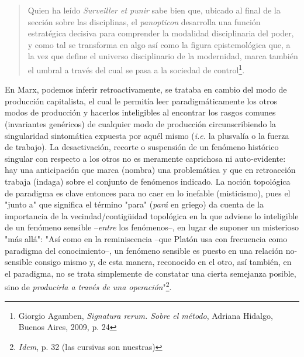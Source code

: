 \documentclass{book}
\begin{document}
\begin{quote}
Quien ha leído \emph{Surveiller et punir} sabe bien que, ubicado al
final de la sección sobre las disciplinas, el \emph{panopticon}
desarrolla una función estratégica decisiva para comprender la modalidad
disciplinaria del poder, y como tal se transforma en algo así como la
figura epistemológica que, a la vez que define el universo disciplinario
de la modernidad, marca también el umbral a través del cual se pasa a la
sociedad de control\footnote{Giorgio Agamben, \emph{Signatura rerum.
  Sobre el método}, Adriana Hidalgo, Buenos Aires, 2009, p. 24}.
\end{quote}

En Marx, podemos inferir retroactivamente, se trataba en cambio del modo
de producción capitalista, el cual le permitía leer paradigmáticamente
los otros modos de producción y hacerlos inteligibles al encontrar los
rasgos comunes (invariantes genéricos) de cualquier modo de producción
circunscribiendo la singularidad sintomática expuesta por aquél mismo
(\emph{i.e.} la plusvalía o la fuerza de trabajo). La desactivación,
recorte o suspensión de un fenómeno histórico singular con respecto a
los otros no es meramente caprichosa ni auto-evidente: hay una
anticipación que marca (nombra) una problemática y que en retroacción
trabaja (indaga) sobre el conjunto de fenómenos indicado. La noción
topológica de paradigma es clave entonces para no caer en lo inefable
(misticismo), pues el "junto a" que significa el término "para"
(\emph{pará} en griego) da cuenta de la importancia de la
vecindad/contigüidad topológica en la que adviene lo inteligible de un
fenómeno sensible --\emph{entre} los fenómenos--, en lugar de suponer un
misterioso "más allá": "Así como en la reminiscencia --que Platón usa
con frecuencia como paradigma del conocimiento--, un fenómeno sensible
es puesto en una relación no-sensible consigo mismo y, de esta manera,
reconocido en el otro, así también, en el paradigma, no se trata
simplemente de constatar una cierta semejanza posible, sino de
\emph{producirla a través de una operación}"\footnote{\emph{Idem}, p. 32
  (las cursivas son nuestras)}.
\end{document}
